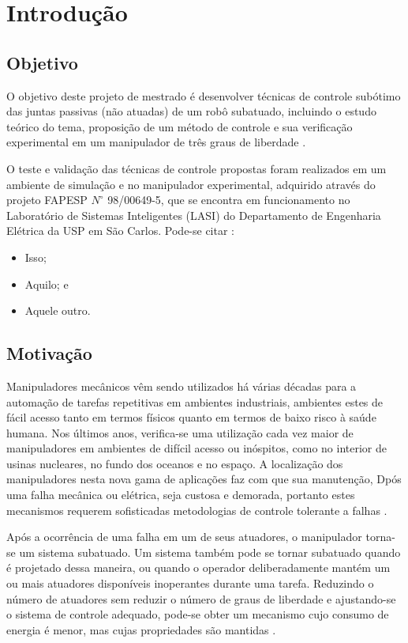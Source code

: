\chapter{Introdução}

\section{Objetivo}
O objetivo deste projeto de mestrado é desenvolver técnicas de controle subótimo das juntas passivas (não atuadas) de um robô subatuado, incluindo o estudo teórico do tema, proposição de um método de controle e sua verificação
experimental em um manipulador de três graus de liberdade \cite{Nascimento1970}.

O teste \cite{Patagonios2001} e validação das técnicas de controle propostas foram realizados em um ambiente de simulação e no manipulador
experimental, adquirido através do projeto FAPESP $N^{\circ}$ 98/00649-5, que se encontra em funcionamento no Laboratório de Sistemas Inteligentes (LASI) do Departamento de Engenharia Elétrica da USP em São Carlos. Pode-se citar \cite{Furmento1995}:
\begin{itemize}
  \item Isso;
  \item Aquilo; e
  \item Aquele outro.
\end{itemize}

\section{Motivação}
Manipuladores mecânicos \cite{Sbornian2002} vêm sendo utilizados há várias décadas para a automação de tarefas
repetitivas em ambientes industriais, ambientes estes de fácil acesso tanto em termos físicos quanto em termos de baixo
risco à saúde humana. Nos últimos anos, verifica-se uma utilização cada vez maior de manipuladores em
ambientes de difícil acesso ou inóspitos, como no interior de usinas nucleares, no fundo dos oceanos e no
espaço. A localização dos manipuladores nesta nova gama de aplicações faz com que sua manutenção,
Dpós uma falha mecânica ou elétrica, seja custosa e demorada, portanto estes mecanismos requerem sofisticadas
metodologias de controle tolerante a falhas \cite{ITALUS2004}.

Após a ocorrência de uma falha em um de seus atuadores, o manipulador torna-se um sistema subatuado. Um sistema também pode se tornar subatuado quando é projetado  dessa maneira, ou quando o operador deliberadamente mantém um ou mais atuadores disponíveis inoperantes durante uma tarefa. Reduzindo o número de atuadores sem reduzir o número de graus de
liberdade e ajustando-se o sistema de controle adequado, pode-se obter um mecanismo cujo consumo de energia é menor, mas cujas propriedades são mantidas \cite{Arystides1994}.

